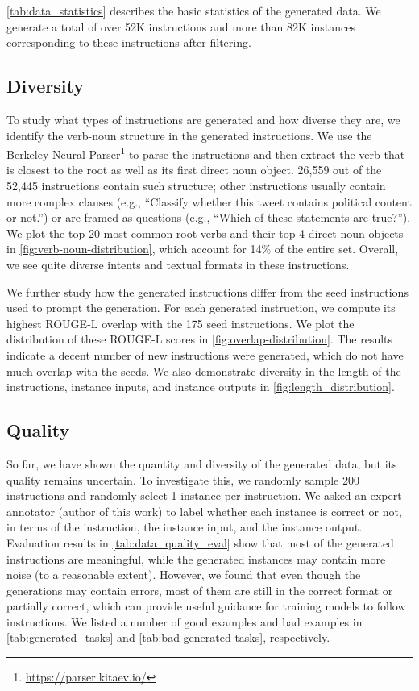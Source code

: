 \documentclass[11pt]{article}
\begin{document}
\autoref{tab:data_statistics} describes the basic statistics of the generated data. We generate a total of over 52K instructions and more than 82K instances corresponding to these instructions after filtering.


\subsection{Diversity}
\label{subsec:diversity}
To study what types of instructions are generated and how diverse they are, we identify the verb-noun structure in the generated instructions. We use the Berkeley Neural Parser\footnote{\url{https://parser.kitaev.io/}} \citep{kitaev-klein-2018-constituency,kitaev-etal-2019-multilingual} to parse the instructions and then extract the verb that is closest to the root 
as well as its first direct noun object. 26,559 out of the 52,445 instructions contain such structure; other instructions usually contain more complex clauses (e.g., ``Classify whether this tweet contains political content or not.'') or are framed as questions (e.g., ``Which of these statements are true?''). 
We plot the top 20 most common root verbs and their top 4
direct noun objects in \autoref{fig:verb-noun-distribution}, which account for 14\% of the entire set. Overall, we see quite diverse intents and textual formats in these instructions.

We further study how the generated instructions differ from the seed instructions used to prompt the generation. For each generated instruction, we compute its highest ROUGE-L overlap with the 175 seed instructions. We plot the distribution of these ROUGE-L scores in \autoref{fig:overlap-distribution}. The results indicate a decent number of new instructions were generated, which do not have much overlap with the seeds. 
We also demonstrate diversity in the length of the instructions, instance inputs, and instance outputs in \autoref{fig:length_distribution}. 

\subsection{Quality}
So far, we have shown the quantity and diversity of the generated data, but its quality remains uncertain. To investigate this, we randomly sample 200 instructions and randomly select 1 instance per instruction. We asked an expert annotator (author of this work) to label whether each instance is correct or not, in terms of the instruction, the instance input, and the instance output. 
Evaluation results in \autoref{tab:data_quality_eval} show that most of the generated instructions are meaningful, while the generated instances may contain more noise (to a reasonable extent). However, we found that even though the generations may contain errors, most of them are still in the correct format or partially correct, which can provide useful guidance for training models to follow instructions. We listed a number of good examples and bad examples in \autoref{tab:generated_tasks} and \ref{tab:bad-generated-tasks}, respectively.
\end{document}
